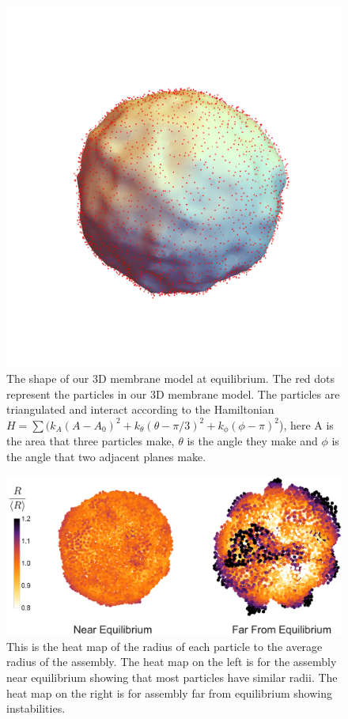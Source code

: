 \documentclass[amsmath,preprintnumbers,10pt,nofootinbib,prl,twocolumn]{revtex4-1}
\begin{document}
\begin{figure}
\includegraphics[width=1\linewidth,angle=0]{Fig10.pdf}
\caption{ The shape of our 3D membrane model at equilibrium. The red dots represent the particles in our 3D membrane model. The particles are triangulated and interact according to the Hamiltonian $H=\sum (k_A(A-A_0)^2 + k_\theta (\theta-\pi/3)^2 + k_\phi (\phi-\pi)^2$), here A is the area that three particles make, $\theta$ is the angle they make and $\phi$ is the angle that two adjacent planes make.  }
\label{fig:3Dmembranesurface}
\end{figure}
\begin{figure}
\includegraphics[width=1\linewidth,angle=0]{Fig11.pdf}
\caption{ This is the heat map of the radius of each particle to the average radius of the assembly. The heat map on the left is for the assembly near equilibrium showing that most particles have similar radii. The heat map on the right is for assembly far from equilibrium showing instabilities.  }
\label{fig:relativeradius3D}
\end{figure}
\end{document}

